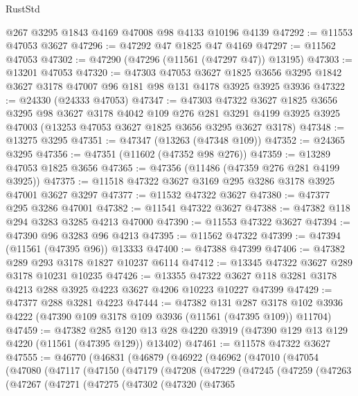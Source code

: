 \begin{lexlean}{RustStd}
\begin{coremodule}
    @267
    @3295
    @1843
    @4169
    @47008
    @98
    @4133
    @10196
    @4139
@47292 := @11553 @47053 @3627
@47296 := @47292 @47 @1825 @47 @4169
@47297 := @11562 @47053
@47302 := @47290 (@47296 (@11561 (@47297 @47)) @13195)
@47303 := @13201 @47053
@47320 := @47303
    @47053
    @3627
    @1825
    @3656
    @3295
    @1842
    @3627
    @3178
    @47007
    @96
    @181
    @98
    @131
    @4178
    @3925
    @3925
    @3936
@47322 := @24330 (@24333 @47053)
@47347 := @47303
    @47322
    @3627
    @1825
    @3656
    @3295
    @98
    @3627
    @3178
    @4042
    @109
    @276
    @281
    @3291
    @4199
    @3925
    @3925
    @47003
    (@13253 @47053 @3627 @1825 @3656 @3295 @3627 @3178)
@47348 := @13275 @3295
@47351 := @47347 (@13263 (@47348 @109))
@47352 := @24365 @3295
@47356 := @47351 (@11602 (@47352 @98 @276))
@47359 := @13289 @47053 @1825 @3656
@47365 := @47356 (@11486 (@47359 @276 @281 @4199 @3925))
@47375 := @11518 @47322 @3627 @3169 @295 @3286 @3178 @3925 @47001 @3627 @3297
@47377 := @11532 @47322 @3627
@47380 := @47377 @295 @3286 @47001
@47382 := @11541 @47322 @3627
@47388 := @47382 @118 @294 @3283 @3285 @4213 @47000
@47390 := @11553 @47322 @3627
@47394 := @47390 @96 @3283 @96 @4213
@47395 := @11562 @47322
@47399 := @47394 (@11561 (@47395 @96)) @13333
@47400 := @47388 @47399
@47406 := @47382 @289 @293 @3178 @1827 @10237 @6114
@47412 := @13345 @47322 @3627 @289 @3178 @10231 @10235
@47426 := @13355
    @47322
    @3627
    @118
    @3281
    @3178
    @4213
    @288
    @3925
    @4223
    @3627
    @4206
    @10223
    @10227
    @47399
@47429 := @47377 @288 @3281 @4223
@47444 := @47382
    @131
    @287
    @3178
    @102
    @3936
    @4222
    (@47390 @109 @3178 @109 @3936 (@11561 (@47395 @109)) @11704)
@47459 := @47382
    @285
    @120
    @13
    @28
    @4220
    @3919
    (@47390 @129 @13 @129 @4220 (@11561 (@47395 @129)) @13402)
@47461 := @11578 @47322 @3627
@47555 := @46770
    (@46831
      (@46879
        (@46922
          (@46962
            (@47010
              (@47054
                (@47080
                  (@47117
                    (@47150
                      (@47179
                        (@47208
                          (@47229
                            (@47245
                              (@47259
                                (@47263
                                  (@47267
                                    (@47271
                                      (@47275
                                        (@47302
                                          (@47320
                                            (@47365

\end{coremodule}
\end{lexlean}
